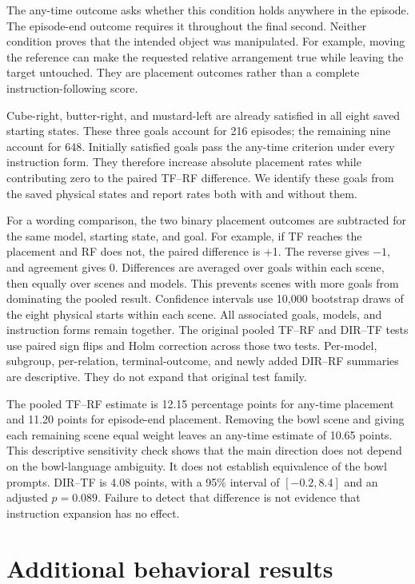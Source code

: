 \documentclass{article}
\begin{document}
The any-time outcome asks whether this condition holds anywhere in the episode. The episode-end outcome requires it throughout the final second. Neither condition proves that the intended object was manipulated. For example, moving the reference can make the requested relative arrangement true while leaving the target untouched. They are placement outcomes rather than a complete instruction-following score.

Cube-right, butter-right, and mustard-left are already satisfied in all eight saved starting states. These three goals account for 216 episodes; the remaining nine account for 648. Initially satisfied goals pass the any-time criterion under every instruction form. They therefore increase absolute placement rates while contributing zero to the paired TF--RF difference. We identify these goals from the saved physical states and report rates both with and without them.

For a wording comparison, the two binary placement outcomes are subtracted for the same model, starting state, and goal. For example, if TF reaches the placement and RF does not, the paired difference is +1. The reverse gives $-1$, and agreement gives 0. Differences are averaged over goals within each scene, then equally over scenes and models. This prevents scenes with more goals from dominating the pooled result. Confidence intervals use 10,000 bootstrap draws of the eight physical starts within each scene. All associated goals, models, and instruction forms remain together. The original pooled TF--RF and DIR--TF tests use paired sign flips and Holm correction across those two tests. Per-model, subgroup, per-relation, terminal-outcome, and newly added DIR--RF summaries are descriptive. They do not expand that original test family.

The pooled TF--RF estimate is 12.15 percentage points for any-time placement and 11.20 points for episode-end placement. Removing the bowl scene and giving each remaining scene equal weight leaves an any-time estimate of 10.65 points. This descriptive sensitivity check shows that the main direction does not depend on the bowl-language ambiguity. It does not establish equivalence of the bowl prompts. DIR--TF is 4.08 points, with a 95\% interval of $[-0.2,8.4]$ and an adjusted $p=0.089$. Failure to detect that difference is not evidence that instruction expansion has no effect.

\section{Additional behavioral results}
\label{app:behavior-results}
\end{document}
